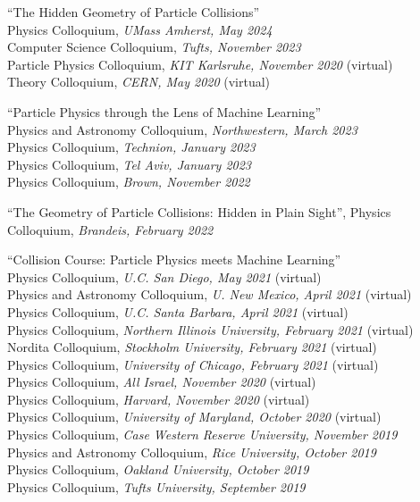 \bbl

\item ``The Hidden Geometry of Particle Collisions''
\\ Physics Colloquium, \emph{UMass Amherst, May 2024}
\\ Computer Science Colloquium, \emph{Tufts, November 2023}
\\ Particle Physics Colloquium, \emph{KIT Karlsruhe, November 2020} (virtual)
\\ Theory Colloquium, \emph{CERN, May 2020} (virtual)

\item ``Particle Physics through the Lens of Machine Learning''
\\ Physics and Astronomy Colloquium, \emph{Northwestern, March 2023}
\\ Physics Colloquium, \emph{Technion, January 2023}
\\ Physics Colloquium, \emph{Tel Aviv, January 2023}
\\ Physics Colloquium, \emph{Brown, November 2022}

\item ``The Geometry of Particle Collisions: Hidden in Plain Sight'', Physics Colloquium, \emph{Brandeis, February 2022}

\item ``Collision Course:  Particle Physics meets Machine Learning''
\\ Physics Colloquium, \emph{U.C. San Diego, May 2021} (virtual)
\\ Physics and Astronomy Colloquium, \emph{U. New Mexico, April 2021} (virtual)
\\ Physics Colloquium, \emph{U.C. Santa Barbara, April 2021} (virtual)
\\ Physics Colloquium, \emph{Northern Illinois University, February 2021} (virtual)
\\ Nordita Colloquium, \emph{Stockholm University, February 2021} (virtual)
\\ Physics Colloquium, \emph{University of Chicago, February 2021} (virtual)
\\ Physics Colloquium, \emph{All Israel, November 2020} (virtual)
\\ Physics Colloquium, \emph{Harvard, November 2020} (virtual)
\\ Physics Colloquium, \emph{University of Maryland, October 2020} (virtual)
\\ Physics Colloquium, \emph{Case Western Reserve University, November 2019}
\\ Physics and Astronomy Colloquium, \emph{Rice University, October 2019}
\\ Physics Colloquium, \emph{Oakland University, October 2019}
\\ Physics Colloquium, \emph{Tufts University, September 2019}

